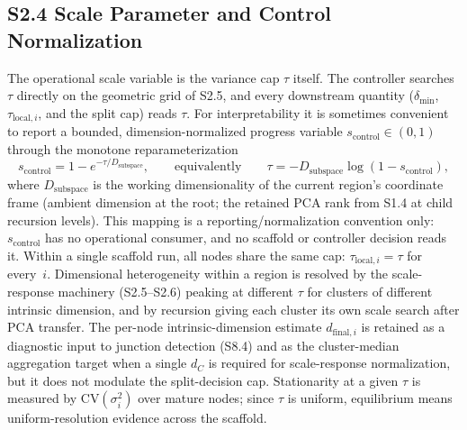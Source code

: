 \documentclass[11pt]{article}
\begin{document}
\subsection*{S2.4 Scale Parameter and Control Normalization}
The operational scale variable is the variance cap $\tau$ itself. The controller searches $\tau$ directly on the geometric grid of S2.5, and every downstream quantity ($\delta_{\min}$, $\tau_{\mathrm{local},i}$, and the split cap) reads $\tau$. For interpretability it is sometimes convenient to report a bounded, dimension-normalized progress variable $s_{\mathrm{control}}\in(0,1)$ through the monotone reparameterization
\[
s_{\mathrm{control}}=1-e^{-\tau/D_{\mathrm{subspace}}},
\qquad\text{equivalently}\qquad
\tau=-D_{\mathrm{subspace}}\log(1-s_{\mathrm{control}}),
\]
where $D_{\mathrm{subspace}}$ is the working dimensionality of the current region's coordinate frame (ambient dimension at the root; the retained PCA rank from S1.4 at child recursion levels). This mapping is a reporting/normalization convention only: $s_{\mathrm{control}}$ has no operational consumer, and no scaffold or controller decision reads it. Within a single scaffold run, all nodes share the same cap: $\tau_{\mathrm{local},i}=\tau$ for every~$i$. Dimensional heterogeneity within a region is resolved by the scale-response machinery (S2.5--S2.6) peaking at different $\tau$ for clusters of different intrinsic dimension, and by recursion giving each cluster its own scale search after PCA transfer. The per-node intrinsic-dimension estimate $d_{\mathrm{final},i}$ is retained as a diagnostic input to junction detection (S8.4) and as the cluster-median aggregation target when a single $d_C$ is required for scale-response normalization, but it does not modulate the split-decision cap. Stationarity at a given $\tau$ is measured by $\mathrm{CV}(\sigma_i^2)$ over mature nodes; since $\tau$ is uniform, equilibrium means uniform-resolution evidence across the scaffold.
\end{document}
